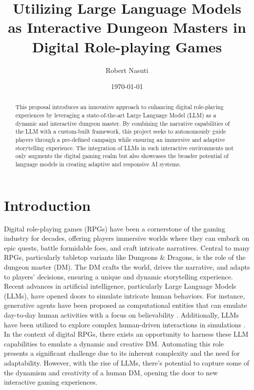 \documentclass[12pt]{article}
\title{Utilizing Large Language Models as Interactive Dungeon Masters in Digital Role-playing Games}
\author{Robert Nasuti}
\date{\today}
\begin{document}
\maketitle
\raggedbottom
\begin{abstract}
This proposal introduces an innovative approach to enhancing digital role-playing experiences by leveraging a state-of-the-art Large Language Model (LLM) as a dynamic and interactive dungeon master. By combining the narrative capabilities of the LLM with a custom-built framework, this project seeks to autonomously guide players through a pre-defined campaign while ensuring an immersive and adaptive storytelling experience. The integration of LLMs in such interactive environments not only augments the digital gaming realm but also showcases the broader potential of language models in creating adaptive and responsive AI systems.
\end{abstract}

\section{Introduction}
Digital role-playing games (RPGs) have been a cornerstone of the gaming industry for decades, offering players immersive worlds where they can embark on epic quests, battle formidable foes, and craft intricate narratives. Central to many RPGs, particularly tabletop variants like Dungeons \& Dragons, is the role of the dungeon master (DM). The DM crafts the world, drives the narrative, and adapts to players' decisions, ensuring a unique and dynamic storytelling experience. Recent advances in artificial intelligence, particularly Large Language Models (LLMs), have opened doors to simulate intricate human behaviors. For instance, generative agents have been proposed as computational entities that can emulate day-to-day human activities with a focus on believability \cite{Park2023GenerativeAI}. Additionally, LLMs have been utilized to explore complex human-driven interactions in simulations \cite{Junprung2023ExploringTI}. In the context of digital RPGs, there exists an opportunity to harness these LLM capabilities to emulate a dynamic and creative DM. Automating this role presents a significant challenge due to its inherent complexity and the need for adaptability. However, with the rise of LLMs, there's potential to capture some of the dynamism and creativity of a human DM, opening the door to new interactive gaming experiences.
\end{document}

